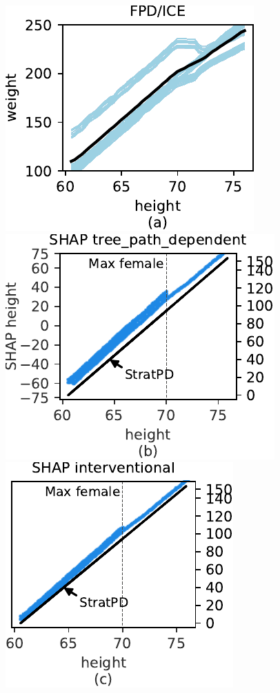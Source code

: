 \documentclass[smallextended]{svjour3}       %
\begin{document}
\begin{figure}[!htbp]
\begin{center}
\includegraphics[scale=0.46]{images/height_vs_weight_pdp.pdf}~\includegraphics[scale=0.46]{images/weight_tree_path_dependent_shap.pdf}
\includegraphics[scale=0.46]{images/weight_interventional_shap.pdf}~

\end{center}
\end{figure}
\end{document}
